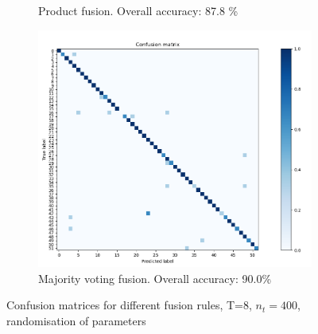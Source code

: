 \documentclass[10pt,technote]{IEEEtran}
\begin{document}
\begin{figure}
\begin{subfigure}[b]{0.3\textwidth}
        \caption{Product fusion. Overall accuracy: 87.8 \%}
    \end{subfigure}  
    \begin{subfigure}[b]{0.3\textwidth}
        \includegraphics[width=\textwidth]{../results/ex2LDAEnsemble/all_rand_maj_conf.png}
        \caption{Majority voting fusion. Overall accuracy: 90.0\%}
    \end{subfigure}    
    
    \caption{Confusion matrices for different fusion rules, T=8, $n_t = 400$, randomisation of parameters}
    \label{fig:conf_matrix_ensemble}
    
\end{figure}
\end{document}
